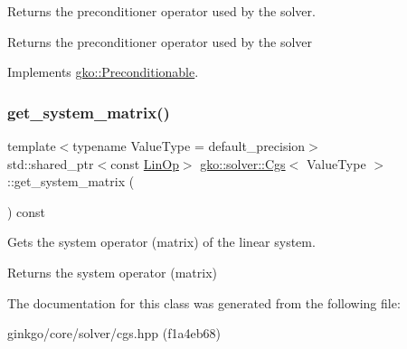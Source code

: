 Returns the preconditioner operator used by the solver. 

\begin{DoxyReturn}{Returns}
the preconditioner operator used by the solver 
\end{DoxyReturn}


Implements \hyperlink{classgko_1_1Preconditionable_ad9545089aef0dfc83bc7a74e5bf1d748}{gko\+::\+Preconditionable}.

\mbox{\label{classgko_1_1solver_1_1Cgs_aa537b2e6b7ccf95e96b4100866da1770}} 
\subsubsection{\texorpdfstring{get\+\_\+system\+\_\+matrix()}{get\_system\_matrix()}}
{\footnotesize\ttfamily template$<$typename Value\+Type  = default\+\_\+precision$>$ \\
std\+::shared\+\_\+ptr$<$const \hyperlink{classgko_1_1LinOp}{Lin\+Op}$>$ \hyperlink{classgko_1_1solver_1_1Cgs}{gko\+::solver\+::\+Cgs}$<$ Value\+Type $>$\+::get\+\_\+system\+\_\+matrix (\begin{DoxyParamCaption}{ }\end{DoxyParamCaption}) const\hspace{0.3cm}{\ttfamily [inline]}}



Gets the system operator (matrix) of the linear system. 

\begin{DoxyReturn}{Returns}
the system operator (matrix) 
\end{DoxyReturn}


The documentation for this class was generated from the following file\+:\begin{DoxyCompactItemize}
\item 
ginkgo/core/solver/cgs.\+hpp (f1a4eb68)\end{DoxyCompactItemize}
